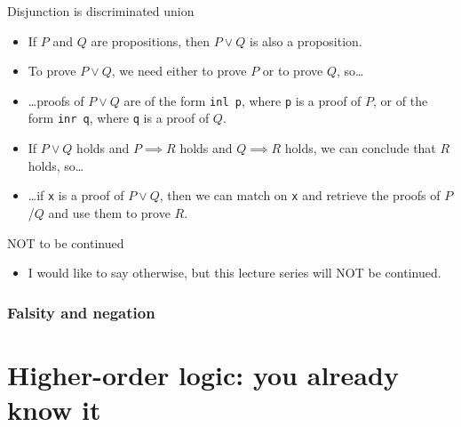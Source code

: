 \documentclass{beamer}
\newcommand{\m}[1]{\texttt{#1}}
\begin{document}
\begin{frame}{Disjunction is discriminated union}
\begin{itemize}
	\item If $P$ and $Q$ are propositions, then $P \lor Q$ is also a proposition.
	\item To prove $P \lor Q$, we need either to prove $P$ or to prove $Q$, so\dots
	\item \dots proofs of $P \lor Q$ are of the form \m{inl p}, where \m{p} is a proof of $P$, or of the form \m{inr q}, where \m{q} is a proof of $Q$.
	\item If $P \lor Q$ holds and $P \implies R$ holds and $Q \implies R$ holds, we can conclude that $R$ holds, so\dots
	\item \dots if \m{x} is a proof of $P \lor Q$, then we can match on \m{x} and retrieve the proofs of $P$/$Q$ and use them to prove $R$.
\end{itemize}
\end{frame}

\begin{frame}{NOT to be continued}
\begin{itemize}
	\item I would like to say otherwise, but this lecture series will NOT be continued.
\end{itemize}
\end{frame}

\subsubsection{Falsity and negation}





\section{Higher-order logic: you already know it}
\end{document}
